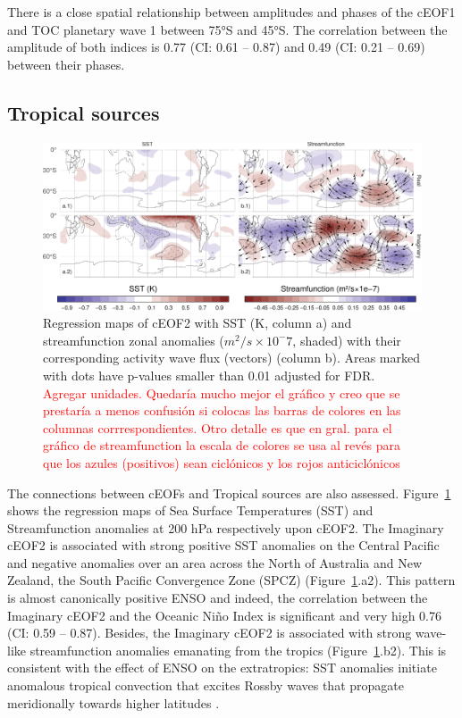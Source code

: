 \documentclass[smallextended]{svjour3}       %
\begin{document}
There is a close spatial relationship between amplitudes and phases of the cEOF1 and TOC planetary wave 1 between 75°S and 45°S.
The correlation between the amplitude of both indices is 0.77 (CI: 0.61 -- 0.87) and 0.49 (CI: 0.21 -- 0.69) between their phases.

\hypertarget{tropical}{%
\subsection{Tropical sources}\label{tropical}}



\begin{figure}
\includegraphics{../figures/sst-psi-2-1} \caption{Regression maps of cEOF2 with SST (K, column a) and streamfunction zonal anomalies (\(m^2/s\times10^-7\), shaded) with their corresponding activity wave flux (vectors) (column b). Areas marked with dots have p-values smaller than 0.01 adjusted for FDR. \textcolor{red}{Agregar unidades. Quedaría mucho mejor el gráfico y creo que se prestaría a menos confusión si colocas las barras de colores en las columnas corrrespondientes. Otro detalle es que en gral. para el gráfico de streamfunction la escala de colores se usa al revés para que los azules (positivos) sean ciclónicos y los rojos anticiclónicos}}\label{fig:sst-psi-2}
\end{figure}

The connections between cEOFs and Tropical sources are also assessed.
Figure~\ref{fig:sst-psi-2} shows the regression maps of Sea Surface Temperatures (SST) and Streamfunction anomalies at 200 hPa respectively upon cEOF2. The Imaginary cEOF2 is associated with strong positive SST anomalies on the Central Pacific and negative anomalies over an area across the North of Australia and New Zealand, the South Pacific Convergence Zone (SPCZ) (Figure~\ref{fig:sst-psi-2}.a2). This pattern is almost canonically positive ENSO \citep{bamston1997} and indeed, the correlation between the Imaginary cEOF2 and the Oceanic Niño Index \citep{bamston1997} is significant and very high 0.76 (CI: 0.59 -- 0.87).
Besides, the Imaginary cEOF2 is associated with strong wave-like streamfunction anomalies emanating from the tropics (Figure~\ref{fig:sst-psi-2}.b2). This is consistent with the effect of ENSO on the extratropics: SST anomalies initiate anomalous tropical convection that excites Rossby waves that propagate meridionally towards higher latitudes \citep{mo2000}.
\end{document}
